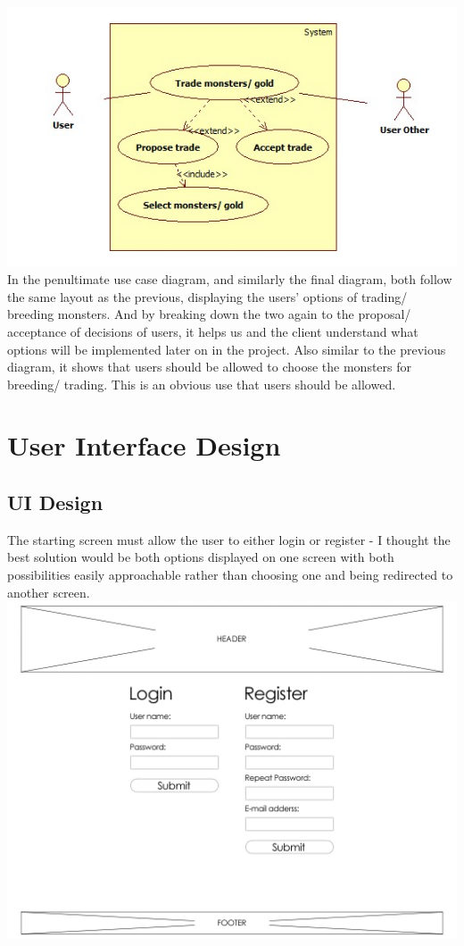 \documentclass[a4paper]{article}
\begin{document}
\begin{center}
\includegraphics[width=\textwidth]{img/UseCaseTrade.jpg}
In the penultimate use case diagram, and similarly the final diagram, both follow the same layout as the previous, displaying the users’ options of trading/ breeding monsters. And by breaking down the two again to the proposal/ acceptance of decisions of users, it helps us and the client understand what options will be implemented later on in the project. Also similar to the previous diagram, it shows that users should be allowed to choose the monsters for breeding/ trading. This is an obvious use that users should be allowed.
\end{center}
\clearpage


\section{User Interface Design}
\subsection{UI Design}

The starting screen must allow the user to either login or register - I thought the best solution would be both options displayed on one screen with both possibilities easily approachable rather than choosing one and being redirected to another screen.\\

\includegraphics[width=\textwidth]{img/UI17.jpg}
\clearpage
\end{document}
